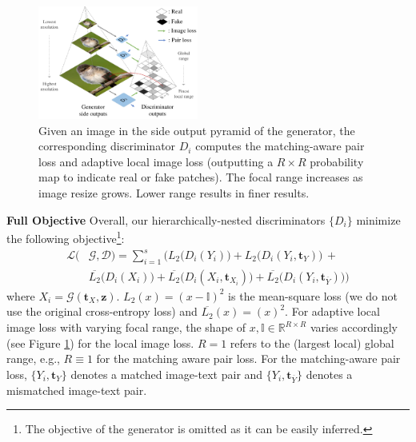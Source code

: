 \documentclass[10pt,twocolumn,letterpaper]{article}
\begin{document}
\begin{figure}[t]
	\centering
	\includegraphics[width=0.47\textwidth]{figure/loss.pdf}
	\vspace{-.2cm}
	\caption{Given an image in the side output pyramid of the generator, the corresponding discriminator $D_i$ computes the matching-aware pair loss and adaptive local image loss (outputting a $R{\times}R$ probability map to indicate real or fake patches). The focal range increases as image resize grows. Lower range results in finer results. }  \vspace{-.3cm}
	\label{fig:loss}
\end{figure}


\textbf{Full Objective } Overall, our hierarchically-nested discriminators $\{D_i\}$ minimize the following objective\footnote{The objective of the generator is omitted as it can be easily inferred.}:
\vspace{-.2cm}
\begin{equation}
\begin{split}
\mathcal{L}(& \mathcal{G}, \mathcal{D})  = \sum_{i=1}^{s} \Big(  L_2\big(D_i({Y}_i)\big) +  L_2\big(D_i({Y}_i, \bm t_{Y})\big) \, + \\ 
& \overline{L_2}\big(D_i({X}_i)\big)  + \overline{L_2}\big(D_i({X}_i, \bm{t}_{X_i})\big) + \overline{L_2}\big(D_i({Y}_i,  \bm{t}_{\overline{Y}})\big) \Big)
\end{split}
\end{equation}
where ${X}_i = \mathcal{G}(\bm{t}_{X}, \bm z)$. $L_2(x) = (x - \mathbb{I})^2$ is the mean-square loss (we do not use the original cross-entropy loss) and $\overline{L_2}(x) =(x)^2$. For adaptive local image loss with varying focal range, the shape of $x, \mathbb{I} \in \mathbb{R}^{R{\times}R}$ varies accordingly (see Figure \ref{fig:loss}) for the local image loss. $R=1$ refers to the (largest local) global range, e.g., $R\equiv1$ for the matching aware pair loss. For the matching-aware pair loss, 
$\{Y_i, \bm t_{Y}\}$ denotes a matched image-text pair and $\{Y_i, \bm{t}_{\overline{Y}}\}$ denotes a mismatched image-text pair.
\end{document}
